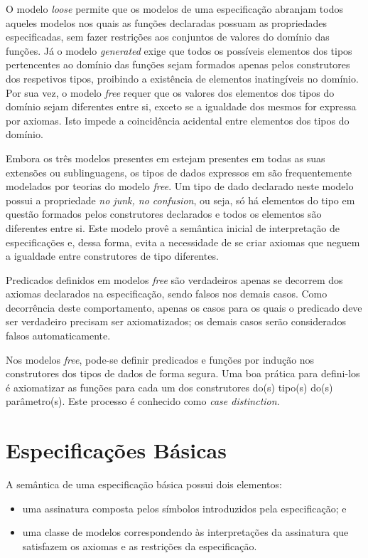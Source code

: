 O modelo \textit{loose} permite que os modelos de uma especificação abranjam todos aqueles modelos nos quais as funções declaradas possuam as propriedades especificadas, sem fazer restrições aos conjuntos de valores do domínio das funções.
Já o modelo \textit{generated} exige que todos os possíveis elementos dos tipos pertencentes ao domínio das funções sejam formados apenas pelos construtores dos respetivos tipos, proibindo a existência de elementos inatingíveis no domínio.
Por sua vez, o modelo \textit{free} requer que os valores dos elementos dos tipos do domínio sejam diferentes entre si, exceto se a igualdade dos mesmos for expressa por axiomas.
Isto impede a coincidência acidental entre elementos dos tipos do domínio.

Embora os três modelos presentes em \CASL estejam presentes em todas as suas extensões ou sublinguagens, os tipos de dados expressos em \HasCASL são frequentemente modelados por teorias do modelo \textit{free}.
Um tipo de dado declarado neste modelo possui a propriedade \textit{no junk, no confusion}, ou seja, só há elementos do tipo em questão formados pelos construtores declarados e todos os elementos são diferentes entre si.
Este modelo provê a semântica inicial de interpretação de especificações e, dessa forma, evita a necessidade de se criar axiomas que neguem a igualdade entre construtores de tipo diferentes.

Predicados definidos em modelos \textit{free} são verdadeiros apenas se decorrem dos axiomas declarados na especificação, sendo falsos nos demais casos.
Como decorrência deste comportamento, apenas os casos para os quais o predicado deve ser verdadeiro precisam ser axiomatizados; os demais casos serão considerados falsos automaticamente.

Nos modelos \textit{free}, pode-se definir predicados e funções por indução nos construtores dos tipos de dados de forma segura. Uma boa prática para defini-los é axiomatizar as funções para cada um dos construtores do(s) tipo(s) do(s) parâmetro(s). Este processo é conhecido como \textit{case distinction}.

\section{Especificações Básicas}
\label{sec:basicspec}

A semântica de uma especificação básica possui dois elementos:
\begin{itemize}
	\item uma assinatura composta pelos símbolos introduzidos pela especificação; e
	\item uma classe de modelos correspondendo às interpretações da assinatura que satisfazem os axiomas e as restrições da especificação.
\end{itemize}


